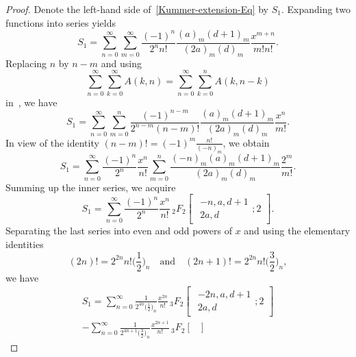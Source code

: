 \documentclass[reqno]{amsart}
\numberwithin{equation}{section}
\theoremstyle{plain}
\theoremstyle{remark}
\begin{document}
\begin{proof}
Denote the left-hand side of~\eqref{Kummer-extension-Eq} by $S_1$. Expanding two functions into series yields
\begin{equation*}
S_1=\sum_{n=0}^{\infty}\sum_{m=0}^{\infty}\frac{(-1)^n}{2^nn!}\frac{(a)_m(d+1)_m}{(2a)_m(d)_m}\frac{x^{m+n}}{m!n!}.
\end{equation*}
Replacing $n$ by $n-m$ and using
\begin{equation*}
\sum_{n=0}^{\infty}\sum_{k=0}^{\infty}A(k,n)=\sum_{n=0}^{\infty}\sum_{k=0}^{n}A(k,n-k)
\end{equation*}
in~\cite[p.~56, Lemma~10]{23}, we have
\begin{equation*}
S_1=\sum_{n=0}^{\infty}\sum_{m=0}^{n}\frac{(-1)^{n-m}}{2^{n-m}(n-m)!} \frac{(a)_m(d+1)_m}{(2a)_m(d)_m}\frac{x^n}{m!}.
\end{equation*}
In view of the identity $(n-m)!=(-1)^m\frac{n!}{(-n)_m}$, we obtain
\begin{equation*}
S_1=\sum_{n=0}^{\infty}\frac{(-1)^n}{2^n}\frac{x^n}{n!} \sum_{m=0}^{n}\frac{(-n)_m(a)_m(d+1)_m}{(2a)_m(d)_m}\frac{2^m}{m!}.
\end{equation*}
Summing up the inner series, we acquire
\begin{equation*}
S_1=\sum_{n=0}^{\infty}\frac{(-1)^n}{2^n}\frac{x^n}{n!}{\,}_2F_2\begin{bmatrix}
\begin{gathered}
-n,a,d+1\\2a,d
\end{gathered};2
\end{bmatrix}.
\end{equation*}
Separating the last series into even and odd powers of $x$ and using the elementary identities
\begin{equation*}
(2n)!=2^{2n}n!\biggl(\frac{1}{2}\biggr)_n \quad\text{and}\quad (2n+1)!=2^{2n}n!\biggl(\frac{3}{2}\biggr)_n,
\end{equation*}
we have
\begin{multline}\label{B.3}
S_1=\sum_{n=0}^{\infty}\frac{1}{2^{4n}\bigl(\frac{1}{2}\bigr)_n}\frac{x^{2n}}{n!} {\,}_3F_2\begin{bmatrix}
\begin{gathered}
-2n,a,d+1\\2a,d
\end{gathered};2
\end{bmatrix}\\
-\sum_{n=0}^{\infty}\frac{1}{2^{4n+1}\bigl(\frac{3}{2}\bigr)_n}\frac{x^{2n+1}}{n!} {\,}_3F_2\begin{bmatrix}

\end{bmatrix}
\end{multline}
\end{proof}
\end{document}
